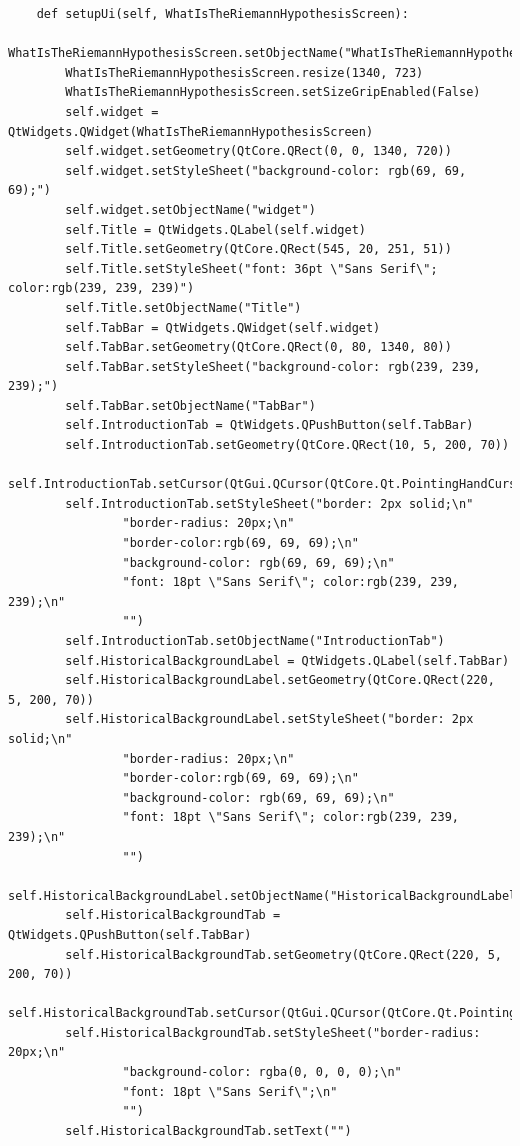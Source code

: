 \documentclass[12pt]{article}
\begin{document}
\begin{lstlisting}
    def setupUi(self, WhatIsTheRiemannHypothesisScreen):
        WhatIsTheRiemannHypothesisScreen.setObjectName("WhatIsTheRiemannHypothesisScreen")
        WhatIsTheRiemannHypothesisScreen.resize(1340, 723)
        WhatIsTheRiemannHypothesisScreen.setSizeGripEnabled(False)
        self.widget = QtWidgets.QWidget(WhatIsTheRiemannHypothesisScreen)
        self.widget.setGeometry(QtCore.QRect(0, 0, 1340, 720))
        self.widget.setStyleSheet("background-color: rgb(69, 69, 69);")
        self.widget.setObjectName("widget")
        self.Title = QtWidgets.QLabel(self.widget)
        self.Title.setGeometry(QtCore.QRect(545, 20, 251, 51))
        self.Title.setStyleSheet("font: 36pt \"Sans Serif\"; color:rgb(239, 239, 239)")
        self.Title.setObjectName("Title")
        self.TabBar = QtWidgets.QWidget(self.widget)
        self.TabBar.setGeometry(QtCore.QRect(0, 80, 1340, 80))
        self.TabBar.setStyleSheet("background-color: rgb(239, 239, 239);")
        self.TabBar.setObjectName("TabBar")
        self.IntroductionTab = QtWidgets.QPushButton(self.TabBar)
        self.IntroductionTab.setGeometry(QtCore.QRect(10, 5, 200, 70))
        self.IntroductionTab.setCursor(QtGui.QCursor(QtCore.Qt.PointingHandCursor))
        self.IntroductionTab.setStyleSheet("border: 2px solid;\n"
                "border-radius: 20px;\n"
                "border-color:rgb(69, 69, 69);\n"
                "background-color: rgb(69, 69, 69);\n"
                "font: 18pt \"Sans Serif\"; color:rgb(239, 239, 239);\n"
                "")
        self.IntroductionTab.setObjectName("IntroductionTab")
        self.HistoricalBackgroundLabel = QtWidgets.QLabel(self.TabBar)
        self.HistoricalBackgroundLabel.setGeometry(QtCore.QRect(220, 5, 200, 70))
        self.HistoricalBackgroundLabel.setStyleSheet("border: 2px solid;\n"
                "border-radius: 20px;\n"
                "border-color:rgb(69, 69, 69);\n"
                "background-color: rgb(69, 69, 69);\n"
                "font: 18pt \"Sans Serif\"; color:rgb(239, 239, 239);\n"
                "")
        self.HistoricalBackgroundLabel.setObjectName("HistoricalBackgroundLabel")
        self.HistoricalBackgroundTab = QtWidgets.QPushButton(self.TabBar)
        self.HistoricalBackgroundTab.setGeometry(QtCore.QRect(220, 5, 200, 70))
        self.HistoricalBackgroundTab.setCursor(QtGui.QCursor(QtCore.Qt.PointingHandCursor))
        self.HistoricalBackgroundTab.setStyleSheet("border-radius: 20px;\n"
                "background-color: rgba(0, 0, 0, 0);\n"
                "font: 18pt \"Sans Serif\";\n"
                "")
        self.HistoricalBackgroundTab.setText("")

\end{lstlisting}
\end{document}
